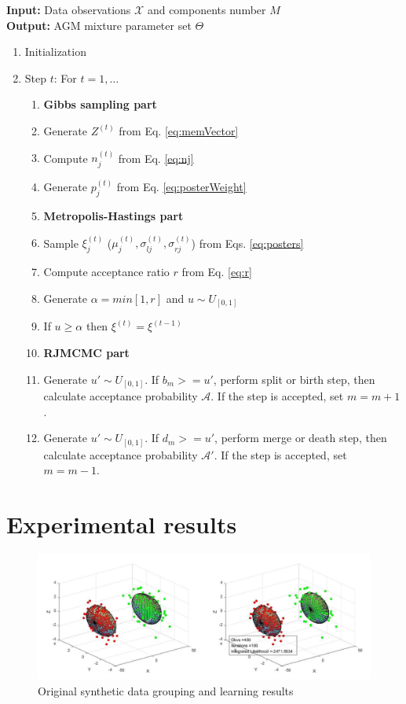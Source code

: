\documentclass[conference]{IEEEtran}
\begin{document}
\noindent\textbf{Input:} Data observations $\mathcal{X}$ and components number $M$ \\
\textbf{Output:} AGM mixture parameter set $\Theta$
\begin{enumerate}
\item Initialization
\item Step $t$: For $t = 1,\ldots$
\begin{enumerate}
\item[]\textbf{Gibbs sampling part}
\item Generate $Z^{(t)}$ from Eq. \eqref{eq:memVector}
\item Compute $n_j^{(t)}$ from Eq. \eqref{eq:nj}
\item Generate $p_j^{(t)}$ from Eq. \eqref{eq:posterWeight}
\item[] \textbf{Metropolis-Hastings part}
\item Sample $\xi_j^{(t)}$ ($\mu_j^{(t)}, \sigma_{lj}^{(t)}, \sigma_{rj}^{(t)}$) from Eqs. \eqref{eq:posters}
\item Compute acceptance ratio $r$ from Eq. \eqref{eq:r}
\item Generate $\alpha = min[1,r]$ and $u \sim U_{[0,1]}$
\item If $u \geq \alpha$ then $\xi^{(t)} = \xi^{(t-1)}$
\item[] \textbf{RJMCMC part}
\item Generate $u' \sim U_{[0,1]}$. If $b_m>=u'$, perform split or birth step, then calculate acceptance probability $\mathcal{A}$. If the step is accepted, set $m=m+1$.
\item Generate $u' \sim U_{[0,1]}$. If $d_m>=u'$, perform merge or death step, then calculate acceptance probability $\mathcal{A}'$. If the step is accepted, set $m=m-1$.
\end{enumerate}
\end{enumerate}

\section{Experimental results}
\begin{figure}[b]
\centering
\includegraphics[width=0.45\paperwidth]{syn.jpg}
\caption{Original synthetic data grouping and learning results}
\label{fig:1}
\end{figure}
\end{document}
